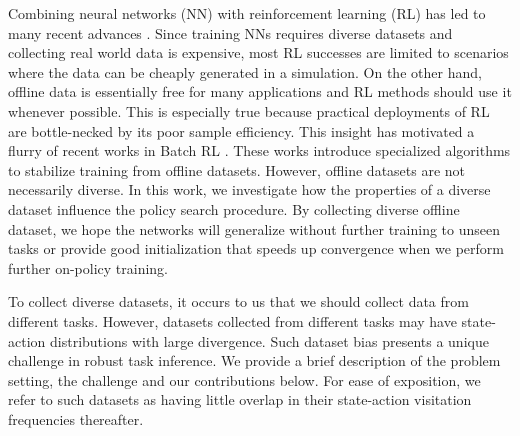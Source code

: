 Combining neural networks (NN) with reinforcement learning (RL) has led to many recent advances \cite{SOP, PPO, SAC, TRPO, SPU}.
Since training NNs requires diverse datasets and collecting real world data is expensive, most RL successes are limited to scenarios where the data can be cheaply generated in a simulation.
On the other hand, offline data is essentially free for many applications and RL methods should use it whenever possible.
This is especially true because practical deployments of RL are bottle-necked by its poor sample efficiency.
This insight has motivated a flurry of recent works in Batch RL \cite{siegel2020keep,agarwal2019optimistic,kumar2019stabilizing,fujimoto2019off,chen2019bail}.
These works introduce specialized algorithms to stabilize training from offline datasets.
However, offline datasets are not necessarily diverse.
In this work, we investigate how the properties of a diverse dataset influence the policy search procedure.
By collecting diverse offline dataset, we hope the networks will generalize without further training to unseen tasks or provide good initialization that speeds up convergence when we perform further on-policy training.

To collect diverse datasets, it occurs to us that we should collect data from different tasks.
However, datasets collected from different tasks may have state-action distributions with large divergence.
Such dataset bias presents a unique challenge in robust task inference.
We provide a brief description of the problem setting, the challenge and our contributions below.
For ease of exposition, we refer to such datasets as having little overlap in their state-action visitation frequencies thereafter.

